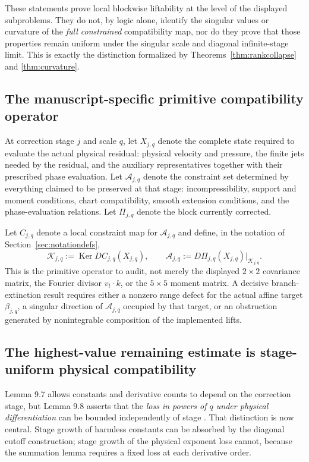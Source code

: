 \documentclass[12pt]{article}
\newcommand{\A}{\mathcal A}
\newcommand{\Ker}{\operatorname{Ker}}
\newcommand{\Kt}{\mathcal K}
\newcommand{\Comp}{\mathscr A}
\begin{document}
These statements prove local blockwise liftability at the level of the displayed subproblems. They do not, by logic alone, identify the singular values or curvature of the \emph{full constrained} compatibility map, nor do they prove that those properties remain uniform under the singular scale and diagonal infinite-stage limit. This is exactly the distinction formalized by Theorems~\ref{thm:rankcollapse} and \ref{thm:curvature}.

\subsection{The manuscript-specific primitive compatibility operator}
At correction stage $j$ and scale $q$, let $X_{j,q}$ denote the complete state required to evaluate the actual physical residual: physical velocity and pressure, the finite jets needed by the residual, and the auxiliary representatives together with their prescribed phase evaluation. Let $\A_{j,q}$ denote the constraint set determined by everything claimed to be preserved at that stage: incompressibility, support and moment conditions, chart compatibility, smooth extension conditions, and the phase-evaluation relations. Let $\Pi_{j,q}$ denote the block currently corrected.

Let $C_{j,q}$ denote a local constraint map for $\A_{j,q}$ and define, in the notation of Section~\ref{sec:notationdefs},
\[
\Kt_{j,q}:=\Ker D C_{j,q}(X_{j,q}),
\qquad
\boxed{
\Comp_{j,q}
:=D\Pi_{j,q}(X_{j,q})|_{\Kt_{j,q}}.
}
\]
This is the primitive operator to audit, not merely the displayed $2\times2$ covariance matrix, the Fourier divisor $v_t\cdot k$, or the $5\times5$ moment matrix. A decisive branch-extinction result requires either a nonzero range defect for the actual affine target $\beta_{j,q}$, a singular direction of $\Comp_{j,q}$ occupied by that target, or an obstruction generated by nonintegrable composition of the implemented lifts.

\subsection{The highest-value remaining estimate is stage-uniform physical compatibility}
Lemma 9.7 allows constants and derivative counts to depend on the correction stage, but Lemma 9.8 asserts that the \emph{loss in powers of $q$ under physical differentiation} can be bounded independently of stage \cite[Lemmas 9.7--9.8]{OpenAI2026}. That distinction is now central. Stage growth of harmless constants can be absorbed by the diagonal cutoff construction; stage growth of the physical exponent loss cannot, because the summation lemma requires a fixed loss at each derivative order.
\end{document}
